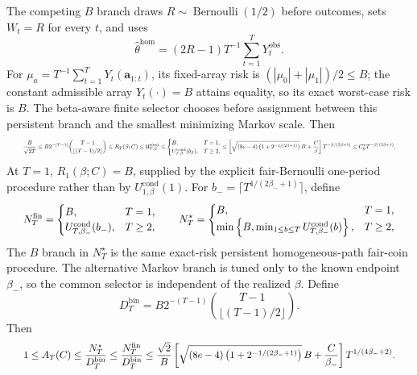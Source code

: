 \documentclass{article}
\begin{document}
\[\] The competing \(B\) branch draws \(R\sim\operatorname{Bernoulli}(1/2)\) before outcomes, sets \(W_t=R\) for every \(t\), and uses \[\widehat\theta^{\mathrm{hom}}=(2R-1)T^{-1}\sum_{t=1}^T Y_t^{\mathrm{obs}}.\] For \(\mu_a=T^{-1}\sum_{t=1}^T Y_t(\mathbf a_{1:t})\), its fixed-array risk is \((|\mu_0|+|\mu_1|)/2\le B\); the constant admissible array \(Y_t(\cdot)=B\) attains equality, so its exact worst-case risk is \(B\). The beta-aware finite selector chooses before assignment between this persistent branch and the smallest minimizing Markov scale. Then \[
\makebox[\linewidth][c]{\resizebox{0.98\linewidth}{!}{\leavevmode\par\noindent \makebox[\linewidth][c]{\resizebox{0.98\linewidth}{!}{\(\displaystyle \displaystyle \frac{B}{\sqrt{2T}}\le B2^{-(T-1)}\binom{T-1}{\lfloor(T-1)/2\rfloor}\le R_T(\beta;C)\le\mathfrak U_{T,\beta}^{\mathrm{cond}}\le\begin{cases}B,&T=1,\\ U_{T,\beta}^{\mathrm{cond}}(b_\beta),&T\ge2,\end{cases}\le\left[\sqrt{(8e-4)\left(1+2^{-1/(2\beta+1)}\right)}\,B+\frac C\beta\right]T^{-\beta/(2\beta+1)}\le C_0^\star T^{-\beta/(2\beta+1)}.\)}}\par\noindent}}
\] At \(T=1\), \(R_1(\beta;C)=B\), supplied by the explicit fair-Bernoulli one-period procedure rather than by \(U_{1,\beta}^{\mathrm{cond}}(1)\). For \(b_-=\lceil T^{1/(2\beta_-+1)}\rceil\), define \[
\makebox[\linewidth][c]{\resizebox{0.98\linewidth}{!}{\leavevmode\par\noindent \makebox[\linewidth][c]{\resizebox{0.98\linewidth}{!}{\(\displaystyle \displaystyle N_T^{\mathrm{fin}}=\begin{cases}B,&T=1,\\ U_{T,\beta_-}^{\mathrm{cond}}(b_-),&T\ge2,\end{cases}\qquad N_T^\star=\begin{cases}B,&T=1,\\ \min\left\{B,\min_{1\le b\le T}U_{T,\beta_-}^{\mathrm{cond}}(b)\right\},&T\ge2,\end{cases}\)}}\par\noindent}}
\] The \(B\) branch in \(N_T^\star\) is the same exact-risk persistent homogeneous-path fair-coin procedure. The alternative Markov branch is tuned only to the known endpoint \(\beta_-\), so the common selector is independent of the realized \(\beta\). Define \[D_T^{\mathrm{bin}}=B2^{-(T-1)}\binom{T-1}{\lfloor(T-1)/2\rfloor}.\] Then \[
\makebox[\linewidth][c]{\resizebox{0.98\linewidth}{!}{\leavevmode\par\noindent \makebox[\linewidth][c]{\resizebox{0.98\linewidth}{!}{\(\displaystyle \displaystyle 1\le A_T(C)\le\frac{N_T^\star}{D_T^{\mathrm{bin}}}\le\frac{N_T^{\mathrm{fin}}}{D_T^{\mathrm{bin}}}\le\frac{\sqrt2}{B}\left[\sqrt{(8e-4)\left(1+2^{-1/(2\beta_-+1)}\right)}\,B+\frac C{\beta_-}\right]T^{1/(4\beta_-+2)}.\)}}\par\noindent}}
\]
\end{document}
